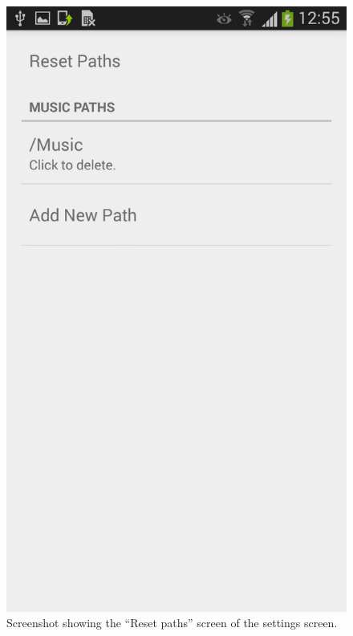 \begin{figure}[h!]
  \centering
    \includegraphics[scale=0.1]{Images/Screenshots/settingsPath.png}
  \caption{Screenshot showing the ``Reset paths'' screen of the settings screen.}
  \label{fig:settingsPath}
\end{figure}